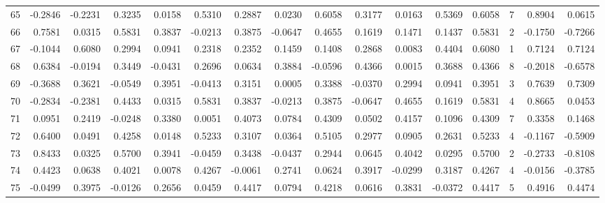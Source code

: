 \begin{tabular}{lrrrrrrrrrrrrrrr}
65  &     -0.2846 & -0.2231 &  0.3235 &  0.0158 &  0.5310 &  0.2887 &  0.0230 &  0.6058 &  0.3177 &  0.0163 &   0.5369 &     0.6058 &      7 &                    0.8904 &                     0.0615 \\
66  &      0.7581 &  0.0315 &  0.5831 &  0.3837 & -0.0213 &  0.3875 & -0.0647 &  0.4655 &  0.1619 &  0.1471 &   0.1437 &     0.5831 &      2 &                   -0.1750 &                    -0.7266 \\
67  &     -0.1044 &  0.6080 &  0.2994 &  0.0941 &  0.2318 &  0.2352 &  0.1459 &  0.1408 &  0.2868 &  0.0083 &   0.4404 &     0.6080 &      1 &                    0.7124 &                     0.7124 \\
68  &      0.6384 & -0.0194 &  0.3449 & -0.0431 &  0.2696 &  0.0634 &  0.3884 & -0.0596 &  0.4366 &  0.0015 &   0.3688 &     0.4366 &      8 &                   -0.2018 &                    -0.6578 \\
69  &     -0.3688 &  0.3621 & -0.0549 &  0.3951 & -0.0413 &  0.3151 &  0.0005 &  0.3388 & -0.0370 &  0.2994 &   0.0941 &     0.3951 &      3 &                    0.7639 &                     0.7309 \\
70  &     -0.2834 & -0.2381 &  0.4433 &  0.0315 &  0.5831 &  0.3837 & -0.0213 &  0.3875 & -0.0647 &  0.4655 &   0.1619 &     0.5831 &      4 &                    0.8665 &                     0.0453 \\
71  &      0.0951 &  0.2419 & -0.0248 &  0.3380 &  0.0051 &  0.4073 &  0.0784 &  0.4309 &  0.0502 &  0.4157 &   0.1096 &     0.4309 &      7 &                    0.3358 &                     0.1468 \\
72  &      0.6400 &  0.0491 &  0.4258 &  0.0148 &  0.5233 &  0.3107 &  0.0364 &  0.5105 &  0.2977 &  0.0905 &   0.2631 &     0.5233 &      4 &                   -0.1167 &                    -0.5909 \\
73  &      0.8433 &  0.0325 &  0.5700 &  0.3941 & -0.0459 &  0.3438 & -0.0437 &  0.2944 &  0.0645 &  0.4042 &   0.0295 &     0.5700 &      2 &                   -0.2733 &                    -0.8108 \\
74  &      0.4423 &  0.0638 &  0.4021 &  0.0078 &  0.4267 & -0.0061 &  0.2741 &  0.0624 &  0.3917 & -0.0299 &   0.3187 &     0.4267 &      4 &                   -0.0156 &                    -0.3785 \\
75  &     -0.0499 &  0.3975 & -0.0126 &  0.2656 &  0.0459 &  0.4417 &  0.0794 &  0.4218 &  0.0616 &  0.3831 &  -0.0372 &     0.4417 &      5 &                    0.4916 &                     0.4474 \\

\end{tabular}
